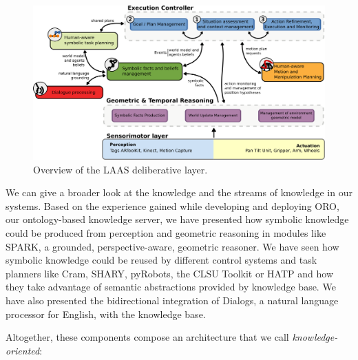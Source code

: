 \documentclass[letterpaper, 10 pt, conference]{ieeeconf}  %
\begin{document}
\cite{Alami2011}

\begin{figure}
        \centering
        \includegraphics[width=1.7\columnwidth]{archi}
        \caption{Overview of the LAAS deliberative layer.}
        \label{fig|archi}
\end{figure}



We can give a broader look at the knowledge and the streams of knowledge in our
systems.  Based on the experience gained while developing and deploying {\sc
ORO}, our ontology-based knowledge server, we have presented how symbolic
knowledge could be produced from perception and geometric reasoning in modules
like {\sc SPARK}, a grounded, perspective-aware, geometric reasoner. We have
seen how symbolic knowledge could be reused by different control systems and
task planners like {\sc Cram}, {\sc SHARY}, {\sc pyRobots}, the {\sc CLSU
Toolkit} or {\sc HATP} and how they take advantage of semantic abstractions
provided by knowledge base. We have also presented the bidirectional
integration of {\sc Dialogs}, a natural language processor for English, with
the knowledge base.

Altogether, these components compose an architecture that we call
\emph{knowledge-oriented}:
\end{document}
